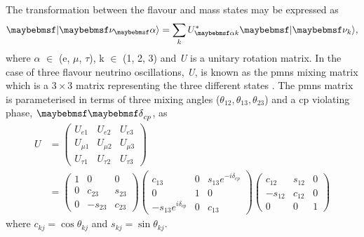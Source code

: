 The transformation between the flavour and mass states may be expressed as
\begin{equation}\label{eqn:state transformation}
    \ket{\nu_\alpha} = \sum_k U^*_{\alpha k} \ket{\nu_k},
\end{equation}
where $\alpha$ $\in$ (e, $\mu$, $\tau$), k $\in$ (1, 2, 3) and \textit{U} is a unitary rotation matrix. In the case of three flavour neutrino oscillations, \textit{U}, is known as the \gls{pmns} mixing matrix which is a $3 \times 3$ matrix representing the three different states \cite{Fundamentals_of_Neutrino_Physics_and_Astrophysics}. The \gls{pmns} matrix is parameterised in terms of three mixing angles ($\theta_{12}, \theta_{13}, \theta_{23}$) and a \gls{cp} violating phase, \textit{$\Kronecker_{cp}$}, as
\begin{equation}
\begin{split}
U &= 
\begin{pmatrix}
U_{e1} & U_{e2} & U_{e3} \\
U_{\mu1} & U_{\mu2} & U_{\mu3}  \\
U_{\tau1} & U_{\tau2} & U_{\tau3}
\end{pmatrix} \\
&=
\begin{pmatrix}
1 & 0 & 0 \\
0 & c_{23} & s_{23}  \\
0 & -s_{23} & c_{23}
\end{pmatrix}
\begin{pmatrix}
c_{13} & 0 & s_{13}e^{-i\delta_{cp}} \\
0 & 1 & 0  \\
-s_{13}e^{i\delta_{cp}} & 0 & c_{13}
\end{pmatrix}
\begin{pmatrix}
c_{12} & s_{12} & 0 \\
-s_{12} & c_{12} & 0  \\
0 & 0 & 1
\end{pmatrix}
\end{split}
\end{equation}
where $c_{kj} = \cos{\theta_{kj}}$ and $s_{kj} = \sin{\theta_{kj}}$.

